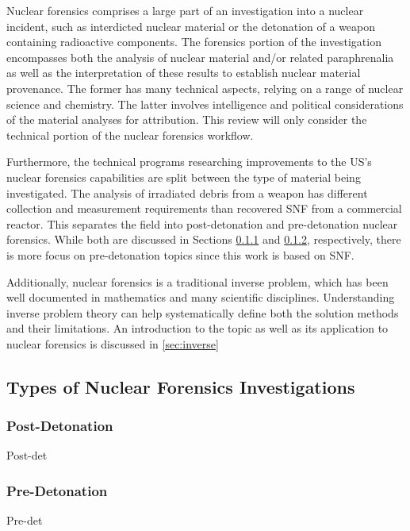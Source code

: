 Nuclear forensics comprises a large part of an investigation into a nuclear
incident, such as interdicted nuclear material or the detonation of a weapon
containing radioactive components.  The forensics portion of the investigation
encompasses both the analysis of nuclear material and/or related paraphrenalia
as well as the interpretation of these results to establish nuclear material
provenance. The former has many technical aspects, relying on a range of
nuclear science and chemistry.  The latter involves intelligence and political
considerations of the material analyses for attribution. This review will only
consider the technical portion of the nuclear forensics workflow.

Furthermore, the technical programs researching improvements to the \gls{US}'s
nuclear forensics capabilities are split between the type of material being
investigated. The analysis of irradiated debris from a weapon has different
collection and measurement requirements than recovered \gls{SNF} from a
commercial reactor. This separates the field into post-detonation and
pre-detonation nuclear forensics. While both are discussed in Sections
\ref{sec:postdet} and \ref{sec:predet}, respectively, there is more focus on
pre-detonation topics since this work is based on \gls{SNF}.

Additionally, nuclear forensics is a traditional inverse problem, which has
been well documented in mathematics and many scientific disciplines.
Understanding inverse problem theory can help systematically define both the
solution methods and their limitations. An introduction to the topic as well as
its application to nuclear forensics is discussed in \ref{sec:inverse}

\subsection{Types of Nuclear Forensics Investigations}
\label{sec:types}

\subsubsection{Post-Detonation}
\label{sec:postdet}

Post-det

\subsubsection{Pre-Detonation}
\label{sec:predet}

Pre-det

